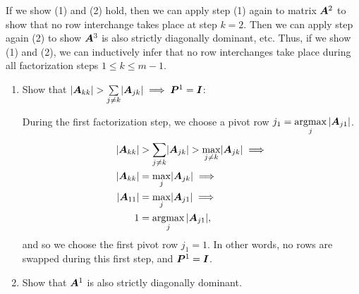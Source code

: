 \documentclass[twoside,10pt]{article}
\DeclareMathOperator*{\argmax}{argmax}
\begin{document}
If we show (1) and (2) hold, then we can apply step (1) again to matrix $\bm{A}^2$ to show that no row interchange takes place at step $k = 2$.
Then we can apply step again (2) to show $\bm{A}^3$ is also strictly diagonally dominant, etc.
Thus, if we show (1) and (2), we can inductively infer that no row interchanges take place during all factorization steps $1 \leq k \leq m - 1$.

\begin{enumerate}
  \item Show that $\left|\mtx{A}_{kk}\right| > \sum \limits_{j \neq k} \left|\mtx{A}_{jk}\right| \implies \mtx{P}^1 = \mtx{I}$:
  
  During the first factorization step, we choose a pivot row $j_1 = \argmax\limits_{j}{\left|\mtx{A}_{j 1}\right|}$.
  \begin{align*}
    \left|\mtx{A}_{kk}\right| &> \sum \limits_{j \neq k} \left|\mtx{A}_{jk}\right| > \max\limits_{j \neq k} \left|\mtx{A}_{jk}\right| \implies\\
    \left|\mtx{A}_{kk}\right| &= \max\limits_{j} \left|\mtx{A}_{jk}\right| \implies\\
    \left|\mtx{A}_{1 1}\right| &= \max\limits_{j} \left|\mtx{A}_{j 1}\right| \implies\\
    1 &= \argmax\limits_{j}{\left|\mtx{A}_{j 1}\right|},
  \end{align*}
  and so we choose the first pivot row $j_1 = 1$.
  In other words, no rows are swapped during this first step, and $\bm{P}^1 = \bm{I}$.
  \item Show that $\bm{A}^{1}$ is also strictly diagonally dominant.


\end{enumerate}
\end{document}
